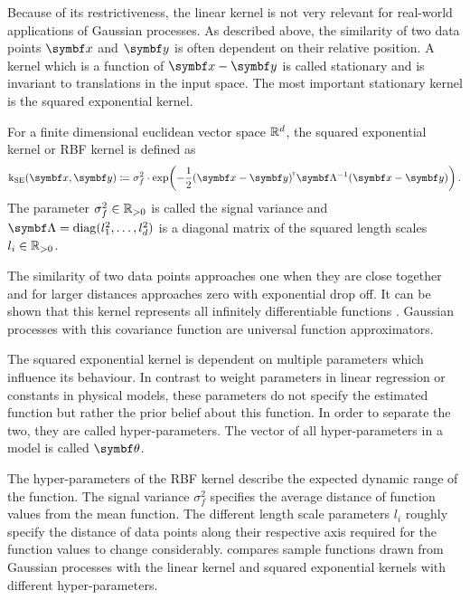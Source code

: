 Because of its restrictiveness, the linear kernel is not very relevant for real-world applications of Gaussian processes.
As described above, the similarity of two data points $\mat{x}$ and $\mat{y}$ is often dependent on their relative position.
A kernel which is a function of $\mat{x} - \mat{y}$ is called stationary and is invariant to translations in the input space.
The most important stationary kernel is the squared exponential kernel.
\begin{definition}
    \label{def:gp:rbf_kernel}
    For a finite dimensional euclidean vector space $\mathbb{R}^d$, the squared exponential kernel or RBF kernel is defined as
    \begin{align}
        \K_{\text{SE}}(\mat{x}, \mat{y}) \coloneqq \sigma_f^2 \cdot \exp\!\left( -\frac{1}{2} (\mat{x} - \mat{y})\tran \mat{\Lambda}^{-1} (\mat{x} - \mat{y}) \right).
    \end{align}
    The parameter $\sigma_f^2 \in \mathbb{R}_{>0}$ is called the signal variance and $\mat{\Lambda} = \diag(l_1^2, \dots, l_d^2)$ is a diagonal matrix of the squared length scales $l_i \in \mathbb{R}_{>0}$.
\end{definition}
The similarity of two data points approaches one when they are close together and for larger distances approaches zero with exponential drop off.
It can be shown that this kernel represents all infinitely differentiable functions \cite{rasmussen_gaussian_2006}.
Gaussian processes with this covariance function are universal function approximators.

The squared exponential kernel is dependent on multiple parameters which influence its behaviour.
In contrast to weight parameters in linear regression or constants in physical models, these parameters do not specify the estimated function but rather the prior belief about this function.
In order to separate the two, they are called hyper-parameters.
The vector of all hyper-parameters in a model is called $\mat{\theta}$.

The hyper-parameters of the RBF kernel describe the expected dynamic range of the function.
The signal variance $\sigma_f^2$ specifies the average distance of function values from the mean function.
The different length scale parameters $l_i$ roughly specify the distance of data points along their respective axis required for the function values to change considerably.
 compares sample functions drawn from Gaussian processes with the linear kernel and squared exponential kernels with different hyper-parameters.

